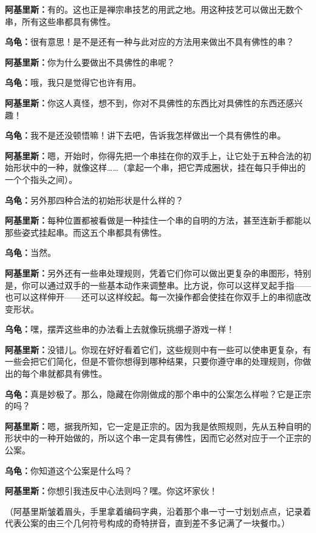 \documentclass[
  12pt,
  twoside,
  openright,
  oldfontcommands,
]{memoir}
\newcommand{\kaitismall}[1]{{\kaitifamily\small #1}}
\newcommand{\dialogname}[1]{{\heifamily\bfseries #1}}
\begin{document}
\dialogname{阿基里斯：}有的。这也正是禅宗串技艺的用武之地。用这种技艺可以做出无数个串，所有这些串都具有佛性。

\dialogname{乌龟：}很有意思！是不是还有一种与此对应的方法用来做出不具有佛性的串？

\dialogname{阿基里斯：}你为什么要做出不具佛性的串呢？

\dialogname{乌龟：}哦，我只是觉得它也许有用。

\dialogname{阿基里斯：}你这人真怪，想不到，你对不具佛性的东西比对具佛性的东西还感兴趣！

\dialogname{乌龟：}我不是还没顿悟嘛！讲下去吧，告诉我怎样做出一个具有佛性的串。

\dialogname{阿基里斯：}嗯，开始时，你得先把一个串挂在你的双手上，让它处于五种合法的初始形状中的一种，就像这样\ldots\ldots{}\kaitismall{（拿起一个串，把它弄成圈状，挂在每只手伸出的一个个指头之间）}。

\dialogname{乌龟：}另外那四种合法的初始形状是什么样的？

\dialogname{阿基里斯：}每种位置都被看做是一种挂住一个串的自明的方法，甚至连新手都能以那些姿式挂起串。而这五个串都具有佛性。

\dialogname{乌龟：}当然。

\dialogname{阿基里斯：}另外还有一些串处理规则，凭着它们你可以做出更复杂的串图形，特别是，你可以通过双手的一些基本动作来调整串。比方说，你可以这样叉起手指------也可以这样伸开------还可以这样绞起。每一次操作都会使挂在你双手上的串彻底改变形状。

\dialogname{乌龟：}嘿，摆弄这些串的办法看上去就像玩挑绷子游戏一样！

\dialogname{阿基里斯：}没错儿。你现在好好看着它们，这些规则中有一些可以使串更复杂，有一些会把它们简化，但是不管你想得到哪种结果，只要你遵守串的处理规则，你做出的每个串就都具有佛性。

\dialogname{乌龟：}真是妙极了。那么，隐藏在你刚做成的那个串中的公案怎么样啦？它是正宗的吗？

\dialogname{阿基里斯：}嗯，据我所知，它一定是正宗的。因为我是依照规则，先从五种自明的形状中的一种开始做的，所以这个串一定具有佛性，因而它必然对应于一个正宗的公案。

\dialogname{乌龟：}你知道这个公案是什么吗？

\dialogname{阿基里斯：}你想引我违反中心法则吗？嘿。你这坏家伙！

（阿基里斯皱着眉头，手里拿着编码字典，沿着那个串一寸一寸划划点点，记录着代表公案的由三个几何符号构成的奇特拼音，直到差不多记满了一块餐巾。）
\end{document}
